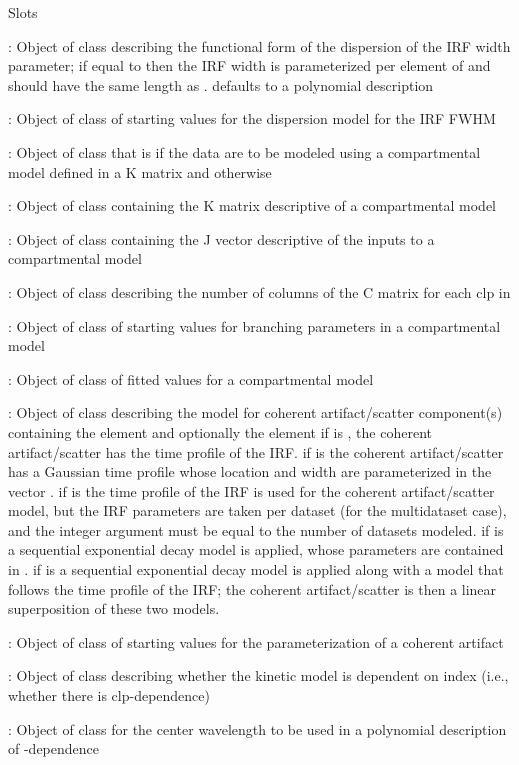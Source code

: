 \begin{Section}{Slots}
\item[\code{disptaufun}:] Object of class   describing the functional form of the 
dispersion of the IRF width parameter; if equal to  then the 
IRF width is parameterized per element of  and  should have the same 
length as .  defaults to a polynomial description
\item[\code{partau}:] Object of class   of starting values for the dispersion model for the 
IRF FWHM 
\item[\code{fullk}:] Object of class   that is  if the data are to be modeled using a 
compartmental model defined in a K matrix and  otherwise
\item[\code{kmat}:] Object of class   containing the K matrix descriptive of  a compartmental 
model
\item[\code{jvec}:] Object of class   containing the J vector descriptive of the inputs to a 
compartmental model
\item[\code{ncolc}:] Object of class   describing the number of columns of the C matrix for 
each clp in 
\item[\code{kinscal}:] Object of class    of starting values for branching parameters in a 
compartmental model
\item[\code{kmatfit}:] Object of class   of fitted values for a compartmental model
\item[\code{cohspec}:] Object of class    describing the model for 
coherent artifact/scatter component(s) containing the element  
and optionally the element 
if  is , the coherent artifact/scatter has the 
time profile of 
the IRF.  if  is  the  coherent 
artifact/scatter has  a
Gaussian time profile whose location and width are parameterized in the 
vector .  if  is  the time profile of 
the IRF is used for
the coherent artifact/scatter model, but the IRF parameters are taken per 
dataset (for the multidataset case), and the integer argument 
 must be equal to the 
number of datasets modeled.  if  is  
a sequential exponential decay 
model is applied, whose parameters are contained in .
if  is  a sequential exponential decay 
model is applied along with a model that follows the time profile of the IRF;
the coherent artifact/scatter is then a linear superposition of these two 
models.  
\item[\code{coh}:] Object of class   of starting values for the parameterization of a  
coherent artifact
\item[\code{wavedep}:] Object of class   describing whether the kinetic model is dependent on
 index (i.e., whether there is clp-dependence)
\item[\code{lambdac}:] Object of class   for the center wavelength to be used in a polynomial 
description of -dependence 
\end{Section}
